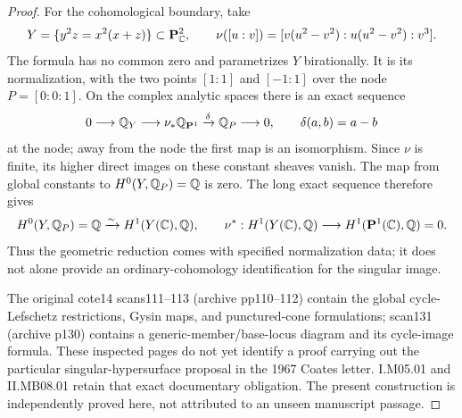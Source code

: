 \begin{proof}
For the cohomological boundary, take
\[
 Y=\{y^2z=x^2(x+z)\}\subset\mathbf P^2_\mathbb C,
 \qquad
 \nu([u:v])=[v(u^2-v^2):u(u^2-v^2):v^3].
\]
The formula has no common zero and parametrizes $Y$ birationally. It is its normalization, with the two points $[1:1]$ and $[-1:1]$ over the node $P=[0:0:1]$. On the complex analytic spaces there is an exact sequence
\[
 0\longrightarrow\mathbb Q_Y\longrightarrow\nu_*\mathbb Q_{\mathbf P^1}
 \xrightarrow{\delta}\mathbb Q_P\longrightarrow0,
 \qquad \delta(a,b)=a-b
\]
at the node; away from the node the first map is an isomorphism. Since $\nu$ is finite, its higher direct images on these constant sheaves vanish. The map from global constants to $H^0(Y,\mathbb Q_P)=\mathbb Q$ is zero. The long exact sequence therefore gives
\[
 H^0(Y,\mathbb Q_P)=\mathbb Q\xrightarrow{\sim}H^1(Y(\mathbb C),\mathbb Q),
 \qquad
 \nu^*:H^1(Y(\mathbb C),\mathbb Q)\longrightarrow H^1(\mathbf P^1(\mathbb C),\mathbb Q)=0.
\]
Thus the geometric reduction comes with specified normalization data; it does not alone provide an ordinary-cohomology identification for the singular image.

The original cote14 scans111--113 (archive pp110--112) contain the global cycle-Lefschetz restrictions, Gysin maps, and punctured-cone formulations; scan131 (archive p130) contains a generic-member/base-locus diagram and its cycle-image formula. These inspected pages do not yet identify a proof carrying out the particular singular-hypersurface proposal in the 1967 Coates letter. I.M05.01 and II.MB08.01 retain that exact documentary obligation. The present construction is independently proved here, not attributed to an unseen manuscript passage.
\end{proof}

